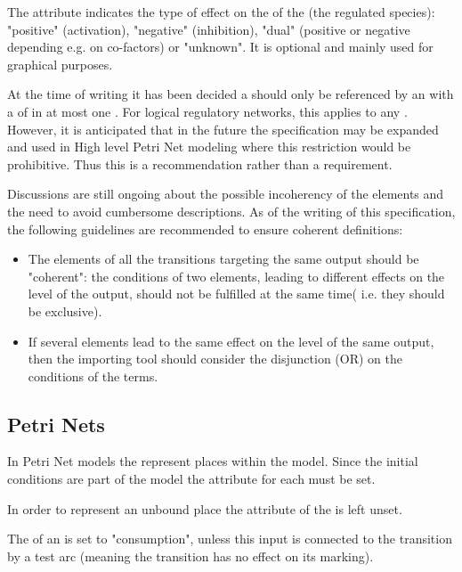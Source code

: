 The  attribute indicates the type of effect on the \Output of the \Transition (the regulated species): "positive" (activation), "negative" (inhibition), "dual" (positive or negative depending e.g. on co-factors) or "unknown". It is optional and mainly used for graphical purposes.


At the time of writing it has been decided a \QualitativeSpecies should only be referenced by an \Output with a  of   in at most one \Transition. For logical regulatory networks, this applies to any \Output.  However, it is anticipated that in the future the specification may be expanded and used in High level Petri Net modeling where this restriction would be prohibitive. Thus this is a recommendation rather than a requirement.  


Discussions are still ongoing about the possible incoherency of the  elements and the need to avoid cumbersome descriptions. As of the writing of this specification, the following guidelines are recommended to ensure coherent definitions:
\begin{itemize}
\item The  elements of all the transitions targeting the same output should be "coherent": the conditions of two  elements, leading to different effects on the level of the output, should not be fulfilled at the same time( i.e. they should be exclusive).
\item If several  elements lead to the same effect on the level of the same output, then the importing tool should consider the disjunction (OR) on the conditions of the terms. 
\end{itemize}
 
\subsection{Petri Nets}

In Petri Net models the \QualitativeSpecies represent places within the model. Since the initial conditions are part of the model the  attribute for each \QualitativeSpecies must be set.

In order to represent an unbound place the  attribute of the \QualitativeSpecies is left unset.

\pagebreak
The  of an  is set to "consumption", unless this input is connected to the transition by a test arc (meaning the transition has no effect on its marking). 


